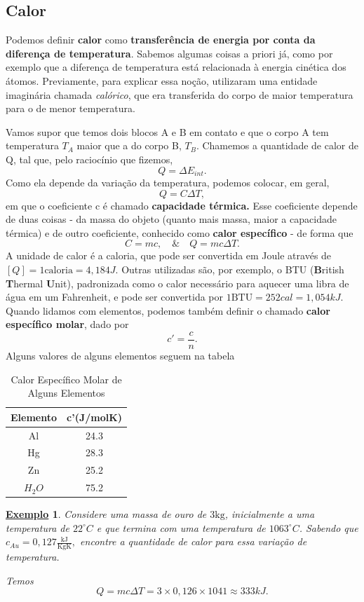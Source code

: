 \documentclass{article}
\newtheorem{example}{\underline{Exemplo}}
\begin{document}
\subsection{Calor}
Podemos definir \textbf{calor} como \textbf{transferência de energia por conta da diferença de temperatura}. Sabemos algumas coisas
a priori já, como por exemplo que a diferença de temperatura está relacionada à energia cinética dos átomos. Previamente,
para explicar essa noção, utilizaram uma entidade imaginária chamada \textit{calórico}, que era transferida do corpo de maior temperatura
para o de menor temperatura.

Vamos supor que temos dois blocos A e B em contato e que o corpo A tem temperatura \(T_{A} \) maior que a do corpo B, \(T_{B}\).
Chamemos a quantidade de calor de Q, tal que, pelo raciocínio que fizemos, 
\[
  Q = \Delta E_{int}.
\]
Como ela depende da variação da temperatura, podemos colocar, em geral, 
\[
  Q = C\Delta T,
\]
em que o coeficiente c é chamado \textbf{capacidade térmica.} Esse coeficiente depende de duas coisas - da massa do objeto (quanto mais massa, maior a capacidade térmica)
e de outro coeficiente, conhecido como \textbf{calor específico} - de forma que 
\[
  C = mc,\quad \&\quad Q = mc\Delta T.
\]
A unidade de calor é a caloria, que pode ser convertida em Joule através de \([Q] = 1\text{caloria} = 4,184J.\) Outras utilizadas são, por exemplo,
o BTU (\textbf{B}ritish \textbf{T}hermal \textbf{U}nit), padronizada como o calor necessário para aquecer uma libra de água em um Fahrenheit, e pode ser convertida por 
\(1\text{BTU} = 252cal = 1,054kJ.\) Quando lidamos com elementos, podemos também definir o chamado \textbf{calor específico molar}, dado por 
\[
  c'= \frac{c}{n}.
\]
Alguns valores de alguns elementos seguem na tabela
\begin{center}
  \begin{table}[h!]
    \caption{Calor Específico Molar de Alguns Elementos}
    \centering
    \begin{tabular}{| c | c |}
      \hline
      Elemento & c'(J/molK)\\
      \hline
      Al & 24.3\\
      Hg & 28.3\\
      Zn & 25.2\\
      \(H_{2}O\) & 75.2\\
      \hline
    \end{tabular}
  \end{table}
\end{center}
\begin{example}
  Considere uma massa de ouro de \(3\text{kg}\), inicialmente a uma temperatura de \(22^{\circ{}}C\) e que termina com
  uma temperatura de \(1063^{\circ{}}C\). Sabendo que \(c_{Au}=0,127\frac{\text{kJ}}{\text{KgK}},\) encontre a quantidade de calor para essa
  variação de temperatura.

  Temos 
  \[
    Q = mc\Delta T = 3\times 0,126\times 1041\approx 333kJ.
  \]
\end{example}
\end{document}
